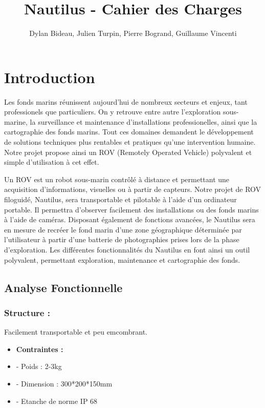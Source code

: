 \documentclass[a4paper,11pt]{report}
\author{Dylan Bideau, Julien Turpin, Pierre Bogrand, Guillaume Vincenti}
\title{Nautilus - Cahier des Charges}
\begin{document}
\maketitle

\chapter{Introduction }

Les fonds marins réunissent aujourd'hui de nombreux secteurs et enjeux, tant professionels que particuliers.
On y retrouve entre autre l'exploration sous-marine, la surveillance et maintenance d'installations professionelles, ainsi que la cartographie des fonds marins. Tout ces domaines demandent le développement de solutions techniques plus rentables et pratiques qu'une intervention humaine. Notre projet propose ainsi un ROV (Remotely Operated Vehicle) polyvalent et simple d'utilisation à cet effet.

Un ROV est un robot sous-marin contrôlé à distance et permettant une acquisition d'informations, visuelles ou à partir de capteurs. Notre projet de ROV filoguidé, Nautilus, sera transportable et pilotable à l'aide d'un ordinateur portable. Il permettra d'observer facilement des installations ou des fonds marins à l'aide de caméras. Disposant également de fonctions avancées, le Nautilus sera en mesure de recréer le fond marin d'une zone géographique déterminée par l'utilisateur à partir d'une batterie de photographies prises lors de la phase d'exploration. Les différentes fonctionnalités du Nautilus en font ainsi un outil polyvalent, permettant exploration, maintenance et cartographie des fonds.
\newpage

\section{Analyse Fonctionnelle}

\subsection{Structure :}
Facilement transportable et peu emcombrant.\newline
\begin{itemize}
	\item \textbf{Contraintes :}
	\item - Poids : 2-3kg
	\item - Dimension : 300*200*150mm
	\item - Etanche de norme IP 68 \newline \newline
\end{itemize}
\end{document}

